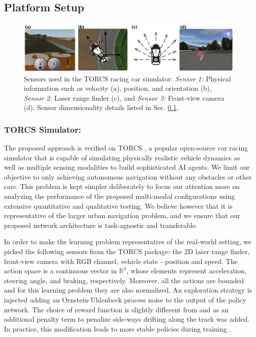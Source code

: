 \documentclass[../thesis.tex]{subfiles}
\begin{document}
\subsection{Platform Setup} \label{sec:platform}

\begin{figure}[t]
	\centering
	\vskip 0.2in
	\includegraphics[width=\columnwidth]{./MultimodalDRL/fig/TORCS.png} %
	\caption{Sensors used in the TORCS racing car simulator: \textit{Sensor 1:} Physical information such as velocity (a), position, and orientation (b), \textit{Sensor 2:} Laser range finder (c), and \textit{Sensor 3:} Front-view camera (d). Sensor dimensionality details listed in Sec. \ref{sec:platform}.}
	\label{fig:TORCS}
\end{figure} 

\subsubsection{TORCS Simulator:}
The proposed approach is verified on TORCS \cite{wymann2000torcs}, a popular open-source car racing simulator that is capable of simulating physically realistic vehicle dynamics as well as multiple sensing modalities \cite{GymTORCS} to build sophisticated AI agents. We limit our objective to only achieving autonomous navigation without any obstacles or other cars. This problem is kept simpler deliberately to focus our attention more on analyzing the performance of the proposed multi-modal configurations using extensive quantitative and qualitative testing. 
We believe however that it is representative of the larger urban navigation problem, and we ensure that our proposed network architecture is task-agnostic and transferable.

In order to make the learning problem representative of the real-world setting, we picked the following sensors from the TORCS package: the 2D laser range finder, front-view camera with RGB channel, vehicle state - position and speed.
The action space is a continuous vector in $\mathbb{R}^3$, whose elements represent acceleration, steering angle, and braking, respectively. Moreover, all the actions are bounded and for this learning problem they are also normalized. 
An exploration strategy is injected adding an Ornstein-Uhlenbeck process noise \cite{uhlenbeck1930theory} to the output of the policy network. 
The choice of reward function is slightly different from  \citet{DBLP:journals/corr/LillicrapHPHETS15} and \citet{A3C} as an additional penalty term to penalize side-ways drifting along the track was added. In practice, this modification leads to more stable policies during training \cite{BenLau16}.
\end{document}
